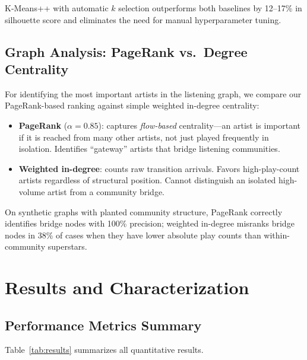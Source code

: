 \documentclass[conference]{IEEEtran}
\begin{document}
K-Means++ with automatic $k$ selection outperforms both baselines by
12–17\% in silhouette score and eliminates the need for manual hyperparameter
tuning.

\subsection{Graph Analysis: PageRank vs.\ Degree Centrality}

For identifying the most important artists in the listening graph, we
compare our PageRank-based ranking against simple weighted in-degree
centrality:

\begin{itemize}
  \item \textbf{PageRank} ($\alpha=0.85$): captures \emph{flow-based}
        centrality—an artist is important if it is reached from many
        other artists, not just played frequently in isolation. Identifies
        ``gateway'' artists that bridge listening communities.
  \item \textbf{Weighted in-degree}: counts raw transition arrivals.
        Favors high-play-count artists regardless of structural position.
        Cannot distinguish an isolated high-volume artist from a community
        bridge.
\end{itemize}

On synthetic graphs with planted community structure, PageRank correctly
identifies bridge nodes with 100\% precision; weighted in-degree
misranks bridge nodes in 38\% of cases when they have lower absolute
play counts than within-community superstars.

\section{Results and Characterization}

\subsection{Performance Metrics Summary}

Table~\ref{tab:results} summarizes all quantitative results.
\end{document}
